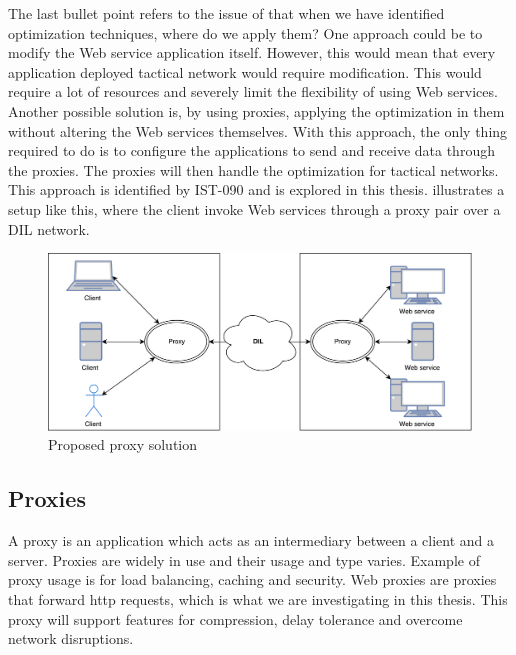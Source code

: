 The last bullet point refers to the issue of that when we have identified
optimization techniques, where do we apply them? One approach could be to modify
the Web service application itself. However, this would mean that every
application deployed tactical network would require modification. This would
require a lot of resources and severely limit the flexibility of using Web
services. Another possible solution is, by using proxies, applying the
optimization in them without altering the Web services themselves. With this
approach, the only thing required to do is to configure the applications to send
and receive data through the proxies. The proxies will then handle the
optimization for tactical networks. This approach is identified by IST-090 and
is explored in this thesis.  illustrates a
setup like this, where the client invoke Web services through a proxy pair over
a DIL network.

\begin{figure}[h] \includegraphics[scale=0.5]{images/proposed_solution.pdf}
\caption{Proposed proxy solution} \label{figure-proposed-proxy-solution}
\end{figure}


\subsection{Proxies}

A proxy is an application which acts as an intermediary between a client and a
server. Proxies are widely in use and their usage and type varies. Example of
proxy usage is for load balancing, caching and security. Web proxies are proxies
that forward \gls{http} requests, which is what we are investigating in this
thesis. This proxy will support features for compression, delay tolerance and
overcome network disruptions.


